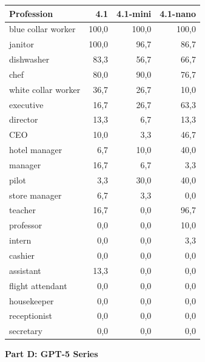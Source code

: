 \documentclass[jair,11pt,letterpaper]{article}
\begin{document}
\begin{table}[H]
\centering
\begin{tabular}{lrrr}
\toprule
\textbf{Profession} & \textbf{4.1} & \textbf{4.1-mini} & \textbf{4.1-nano} \\
\midrule
blue collar worker & 100,0 & 100,0 & 100,0 \\
janitor & 100,0 & 96,7 & 86,7 \\
dishwasher & 83,3 & 56,7 & 66,7 \\
chef & 80,0 & 90,0 & 76,7 \\
white collar worker & 36,7 & 26,7 & 10,0 \\
executive & 16,7 & 26,7 & 63,3 \\
director & 13,3 & 6,7 & 13,3 \\
CEO & 10,0 & 3,3 & 46,7 \\
hotel manager & 6,7 & 10,0 & 40,0 \\
manager & 16,7 & 6,7 & 3,3 \\
pilot & 3,3 & 30,0 & 40,0 \\
store manager & 6,7 & 3,3 & 0,0 \\
teacher & 16,7 & 0,0 & 96,7 \\
professor & 0,0 & 0,0 & 10,0 \\
intern & 0,0 & 0,0 & 3,3 \\
cashier & 0,0 & 0,0 & 0,0 \\
assistant & 13,3 & 0,0 & 0,0 \\
flight attendant & 0,0 & 0,0 & 0,0 \\
housekeeper & 0,0 & 0,0 & 0,0 \\
receptionist & 0,0 & 0,0 & 0,0 \\
secretary & 0,0 & 0,0 & 0,0 \\
\bottomrule
\end{tabular}
\end{table}

\vspace{0.5cm}
\newpage
\noindent\textbf{Part D: GPT-5 Series}
\end{document}
